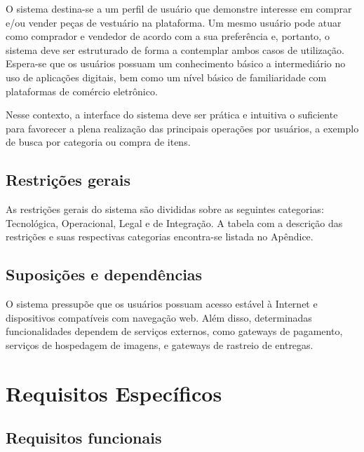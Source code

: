 ﻿\documentclass[12pt,a4paper]{article}
\begin{document}
O sistema destina-se a um perfil de usuário que demonstre interesse em comprar e/ou vender peças de vestuário na plataforma. Um mesmo usuário pode atuar como comprador e vendedor de acordo com a sua preferência e, portanto, o sistema deve ser estruturado de forma a contemplar ambos casos de utilização. Espera-se que os usuários possuam um conhecimento básico a intermediário no uso de aplicações digitais, bem como um nível básico de familiaridade com plataformas de comércio eletrônico.

Nesse contexto, a interface do sistema deve ser prática e intuitiva o suficiente para favorecer a plena realização das principais operações por usuários, a exemplo de busca por categoria ou compra de itens.

\subsection{Restrições gerais}
\label{sec:RestricoesGerais}
As restri\c{c}\~oes gerais do sistema s\~ao divididas sobre as seguintes categorias: Tecnol\'ogica, Operacional, Legal e de Integra\c{c}\~ao. A tabela com a descrição das restrições e suas respectivas categorias encontra-se listada no Apêndice.

\subsection{Suposições e dependências}
\label{sec:Suposicoes}

O sistema pressupõe que os usuários possuam acesso estável à Internet e dispositivos compatíveis com navegação web. Além disso, determinadas funcionalidades dependem de serviços externos, como gateways de pagamento, serviços de hospedagem de imagens, e gateways de rastreio de entregas.

\section{Requisitos Específicos}
\label{sec:RequisitosEspecificos}

\subsection{Requisitos funcionais}
\label{sec:RequisitosFuncionais}
\end{document}
